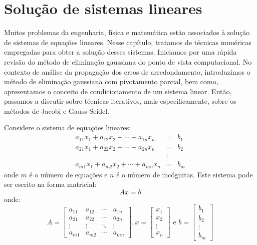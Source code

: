 
%


\chapter{Solução de sistemas lineares}

Muitos problemas da engenharia, física e matemática estão associados à solução de sistemas de equações lineares. Nesse capítulo, tratamos de técnicas numéricas empregadas para obter a solução desses sistemas. Iniciamos por uma rápida revisão do método de eliminação gaussiana do ponto de vista computacional. No contexto de análise da propagação dos erros de arredondamento, introduzimos o método de eliminação gaussiana com pivotamento parcial, bem como, apresentamos o conceito de condicionamento de um sistema linear. Então, passamos a discutir sobre técnicas iterativos, mais especificamente, sobre os métodos de Jacobi e Gauss-Seidel.


Considere o sistema de equações lineares:
\begin{eqnarray*}
a_{11}x_1 + a_{12}x_2 + \cdots +a_{1n}x_n &=& b_1\\
a_{21}x_1 + a_{22}x_2 + \cdots +a_{2n}x_n &=& b_2\\
                                      &\vdots& \\
a_{m1}x_1 + a_{m2}x_2 + \cdots +a_{mn}x_n &=& b_m
\end{eqnarray*}
onde $m$ é o número de equações e $n$ é o número de incógnitas.  Este sistema pode ser escrito na forma matricial:
\begin{equation*}
  Ax = b
\end{equation*}
onde:
\begin{equation*}
  A=\begin{bmatrix}
a_{11} & a_{12} & \cdots & a_{1n}\\
a_{21} & a_{22} & \cdots & a_{2n}\\
\vdots & \vdots & \ddots & \vdots\\
a_{m1} & a_{m2} & \cdots & a_{mn}
\end{bmatrix},
x=\begin{bmatrix}
x_{1} \\
x_{2} \\
\vdots \\
x_{n}
\end{bmatrix}
 \text{ e } b=\begin{bmatrix}
b_{1} \\
b_{2} \\
\vdots \\
b_{m}
\end{bmatrix}
\end{equation*}

